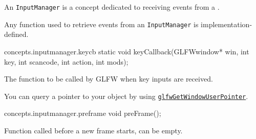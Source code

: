 
\pnum
An \texttt{InputManager} is a concept dedicated to receiving events from a .

\pnum
\remarks Any function used to retrieve events from an \texttt{InputManager} is
implementation-defined.


\begin{tewicode}{concepts.inputmanager.keycb}
static void keyCallback(GLFWwindow* win, int key, int scancode, int action, int mods);
\end{tewicode}

\pnum
The function to be called by GLFW when key inputs are received.


\pnum
\remarks You can query a pointer to your object by using \href{https://www.glfw.org/docs/latest/group__window.html\#ga17807ce0f45ac3f8bb50d6dcc59a4e06}{\texttt{glfwGetWindowUserPointer}}.

\begin{tewicode}{concepts.inputmanager.preframe}
void preFrame();
\end{tewicode}

\pnum
Function called before a new frame starts, can be empty.

